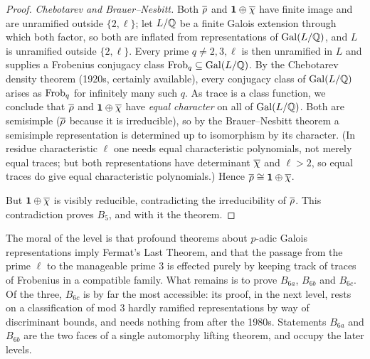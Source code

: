 \documentclass[11pt]{article}
\begin{document}
\begin{proof}
\medskip\noindent\emph{Chebotarev and Brauer--Nesbitt.} Both $\overline{\rho}$ and
$\mathbf1\oplus\overline{\chi}$ have finite image and are unramified outside $\{2,\ell\}$;
let $L/\mathbb{Q}$ be a finite Galois extension through which both factor, so both are
inflated from representations of $\operatorname{Gal}(L/\mathbb{Q})$, and $L$ is unramified outside
$\{2,\ell\}$. Every prime $q\neq2,3,\ell$ is then unramified in $L$ and supplies
a Frobenius conjugacy class $\operatorname{Frob}_q\subseteq\operatorname{Gal}(L/\mathbb{Q})$. By the Chebotarev
density theorem (1920s, certainly available), every conjugacy class of
$\operatorname{Gal}(L/\mathbb{Q})$ arises as $\operatorname{Frob}_q$ for infinitely many such $q$. As trace is a
class function, we conclude that $\overline{\rho}$ and $\mathbf1\oplus\overline{\chi}$ have
\emph{equal character} on all of $\operatorname{Gal}(L/\mathbb{Q})$. Both are semisimple ($\overline{\rho}$
because it is irreducible), so by the Brauer--Nesbitt theorem a semisimple
representation is determined up to isomorphism by its character. (In residue
characteristic $\ell$ one needs equal characteristic polynomials, not merely
equal traces; but both representations have determinant $\overline{\chi}$ and $\ell>2$,
so equal traces do give equal characteristic polynomials.) Hence
$\overline{\rho}\cong\mathbf1\oplus\overline{\chi}$.

\medskip\noindent
But $\mathbf1\oplus\overline{\chi}$ is visibly reducible, contradicting the
irreducibility of $\overline{\rho}$. This contradiction proves $B_5$, and with it the
theorem.
\end{proof}

\begin{remark}
The moral of the level is that profound theorems about $p$-adic Galois
representations imply Fermat's Last Theorem, and that the passage from the
prime $\ell$ to the manageable prime $3$ is effected purely by keeping track
of traces of Frobenius in a compatible family. What remains is to prove
$B_{6a}$, $B_{6b}$ and $B_{6c}$. Of the three, $B_{6c}$ is by far the most
accessible: its proof, in the next level, rests on a classification of mod $3$
hardly ramified representations by way of discriminant bounds, and needs
nothing from after the 1980s. Statements $B_{6a}$ and $B_{6b}$ are the two
faces of a single automorphy lifting theorem, and occupy the later levels.
\end{remark}
\end{document}
